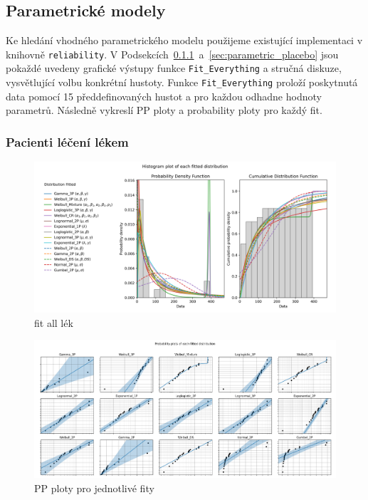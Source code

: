 \documentclass[a4, 11pt]{article}
\theoremstyle{definition}
\theoremstyle{remark}
\begin{document}
	
	\subsection{Parametrické modely}
	Ke hledání vhodného parametrického modelu použijeme existující implementaci v knihovně \texttt{reliability}. 
	V Podsekcích~\ref{sec:parametric_drugs}~a~\ref{sec:parametric_placebo} jsou pokaždé uvedeny grafické výstupy funkce \texttt{Fit\_Everything} a stručná diskuze, vysvětlující volbu konkrétní hustoty.
	Funkce \texttt{Fit\_Everything} proloží poskytnutá data pomocí 15 předdefinovaných hustot a pro každou odhadne hodnoty parametrů. Následně vykreslí PP ploty a probability ploty pro každý fit.
	
	
	\subsubsection{Pacienti léčení lékem} \label{sec:parametric_drugs}
	
	\begin{figure}[H]
		\centering
		\includegraphics[width=1.0\linewidth]{img/fiteverything_drugs_histogram.png}
		\caption{fit all lék}
		\label{fig:fit_everything_hist_drugs}
	\end{figure}

	\begin{figure}[H]
		\centering
		\includegraphics[width=0.9\linewidth]{img/fiteverything_drug_PP_plots.png}
		\caption{PP ploty pro jednotlivé fity}
		\label{fig:fit_everything_drug_PP_plots}
	\end{figure}
\end{document}
